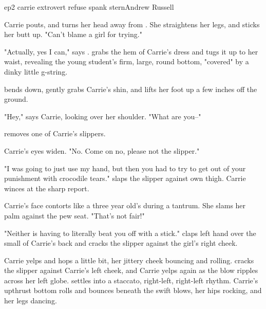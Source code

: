 \documentclass{book}
\begin{document}
\begin{childnode}{ep2 carrie extrovert refuse spank stern}{Andrew Russell}

    Carrie pouts, and turns her head away from \name{}. She straightens her legs, and sticks her butt up. "Can't blame a girl for trying."

    "Actually, yes I can," says \name{}. \HeShe{} grabs the hem of Carrie's dress and tugs it up to her waist, revealing the young student's firm, large, round bottom, "covered" by a dinky little 
    g-string. 


    \name{} bends down, gently grabs Carrie's shin, and lifts her foot up a few inches off the ground.

    "Hey," says Carrie, looking over her shoulder. "What are you--"

    \name{} removes one of Carrie's slippers.

    Carrie's eyes widen. "No. Come on no, please not the slipper."

    "I was going to just use my hand, but then you had to try to get out of your punishment with crocodile tears."  \name{} slaps the slipper against \hisher{} own thigh. Carrie winces at the sharp 
    report.

    Carrie's face contorts like a three year old's during a tantrum. She slams her palm against the pew seat. "That's not fair!"

    "Neither is having to literally beat you off with a stick." \name{} claps \hisher{} left hand over the small of Carrie's back and cracks the slipper against the girl's right cheek.

    Carrie yelps and hops a little bit, her jittery cheek bouncing and rolling. \name{} cracks the slipper against Carrie's left cheek, and Carrie yelps again as the blow ripples across her left globe. \name{} settles into a staccato, right-left, right-left rhythm. 
    Carrie's upthrust bottom rolls and bounces beneath the swift blows, her hips rocking, and her legs dancing.


\end{childnode}
\end{document}
